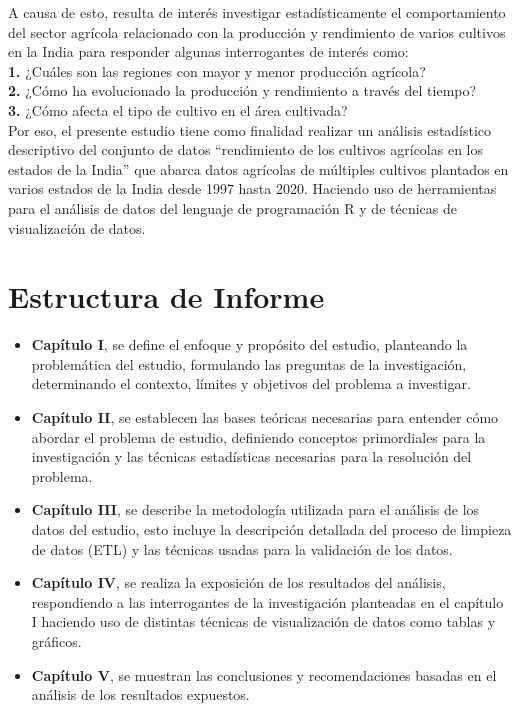 \documentclass[oneside,11pt]{Latex/Classes/PhDthesisPSnPDF}
\begin{document}
A causa de esto, resulta de interés investigar estadísticamente el
comportamiento del sector agrícola relacionado con la producción y
rendimiento de varios cultivos en la India para responder algunas
interrogantes de interés como:\\

\textbf{1.} ¿Cuáles son las regiones con mayor y menor producción
agrícola?\\

\textbf{2.} ¿Cómo ha evolucionado la producción y rendimiento a través
del tiempo?\\

\textbf{3.} ¿Cómo afecta el tipo de cultivo en el área cultivada?\\

Por eso, el presente estudio tiene como finalidad realizar un análisis
estadístico descriptivo del conjunto de datos ``rendimiento de los
cultivos agrícolas en los estados de la India'' que abarca datos
agrícolas de múltiples cultivos plantados en varios estados de la India
desde 1997 hasta 2020. Haciendo uso de herramientas para el análisis de
datos del lenguaje de programación R y de técnicas de visualización de
datos.\\

\section*{Estructura de Informe}

\begin{itemize}

    \item \textbf{Capítulo I}, se define el enfoque y propósito del estudio, planteando la problemática del estudio, formulando las preguntas de la investigación, determinando el contexto, límites y objetivos del problema a investigar.
    
    \item \textbf{Capítulo II}, se establecen las bases teóricas necesarias para entender cómo abordar el problema de estudio, definiendo conceptos primordiales para la investigación y las técnicas estadísticas necesarias para la resolución del problema.
    
    \item \textbf{Capítulo III}, se describe la metodología utilizada para el análisis de los datos del estudio, esto incluye la descripción detallada del proceso de limpieza de datos (ETL) y las técnicas usadas para la validación de los datos.
    
    \item \textbf{Capítulo IV}, se realiza la exposición de los resultados del análisis, respondiendo a las interrogantes de la investigación planteadas en el capítulo I haciendo uso de distintas técnicas de visualización  de datos como tablas y gráficos.
    
    \item \textbf{Capítulo V}, se muestran las conclusiones y recomendaciones basadas en el análisis de los resultados expuestos.
    
\end{itemize}
\end{document}
